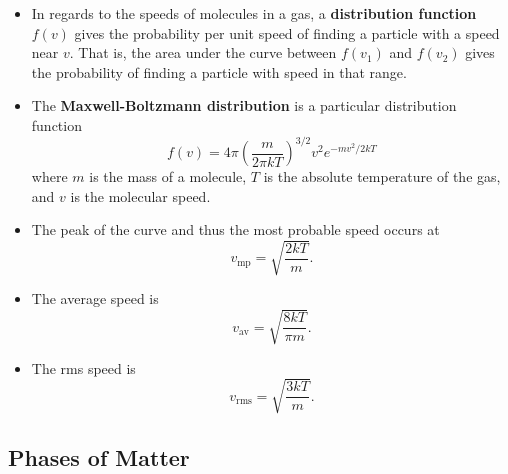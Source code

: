 \documentclass{article}
\begin{document}
\begin{itemize}
  \item In regards to the speeds of molecules in a gas, a \textbf{distribution function} $f(v)$ gives the probability per unit speed of finding a particle with a speed near $v$. That is, the area under the curve between $f(v_1)$ and $f(v_2)$ gives the probability of finding a particle with speed in that range.

  \item The \textbf{Maxwell-Boltzmann distribution} is a particular distribution\\function \[f(v) = 4 \pi \left( \frac{m}{2 \pi k T} \right)^{3 / 2} v^2 e^{-m v^2 / 2 k T}\] where $m$ is the mass of a molecule, $T$ is the absolute temperature of the gas, and $v$ is the molecular speed.

  \item The peak of the curve and thus the most probable speed occurs at \[v_\text{mp} = \sqrt{\frac{2 k T}{m}}.\]

  \item The average speed is \[v_\text{av} = \sqrt{\frac{8 k T}{\pi m}}.\]

  \item The rms speed is \[v_\text{rms} = \sqrt{\frac{3 k T}{m}}.\]
\end{itemize}

\subsection{Phases of Matter}
\end{document}
